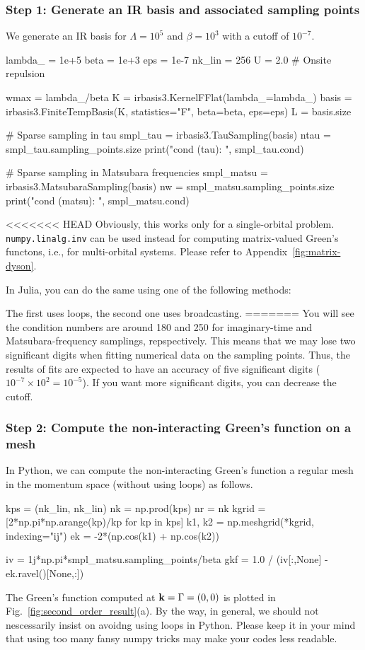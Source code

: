 \documentclass[submission, LectureNotes]{SciPost}
\newcommand{\bk}{\ensuremath{{\bf k}}}
\newcommand\ii{\mathrm{i}}%
\newcommand\iv{\ii\nu}%
\begin{document}
\subsubsection*{Step 1: Generate an IR basis and associated sampling points}
We generate an IR basis for $\Lambda=10^5$ and $\beta=10^3$ with a cutoff of $10^{-7}$.
\begin{python}
lambda_ = 1e+5
beta = 1e+3
eps = 1e-7
nk_lin = 256
U = 2.0 # Onsite repulsion

wmax = lambda_/beta
K = irbasis3.KernelFFlat(lambda_=lambda_)
basis = irbasis3.FiniteTempBasis(K, statistics="F", beta=beta, eps=eps)
L = basis.size

# Sparse sampling in tau
smpl_tau = irbasis3.TauSampling(basis)
ntau = smpl_tau.sampling_points.size
print("cond (tau): ", smpl_tau.cond)

# Sparse sampling in Matsubara frequencies
smpl_matsu = irbasis3.MatsubaraSampling(basis)
nw = smpl_matsu.sampling_points.size
print("cond (matsu): ", smpl_matsu.cond)
\end{python}
<<<<<<< HEAD
Obviously, this works only for a single-orbital problem.
\texttt{numpy.linalg.inv} can be used instead for computing matrix-valued Green's functons, i.e., for multi-orbital systems.
Please refer to Appendix~\ref{fig:matrix-dyson}.

In Julia, you can do the same using one of the following methods:

The first uses loops, the second one uses broadcasting.
=======
You will see the condition numbers are around 180 and 250 for imaginary-time and Matsubara-frequency samplings,
repspectively.
This means that we may lose two significant digits when fitting numerical data on the sampling points.
Thus, the results of fits are expected to have an accuracy of five significant digits ($10^{-7} \times 10^2 = 10^{-5}$).
If you want more significant digits, you can decrease the cutoff.

\subsubsection*{Step 2: Compute the non-interacting Green's function on a mesh}
In Python, we can compute the non-interacting Green's function a regular mesh in 
the momentum space (without using loops) as follows.
\begin{python}
kps = (nk_lin, nk_lin)
nk = np.prod(kps)
nr = nk
kgrid = [2*np.pi*np.arange(kp)/kp for kp in kps]
k1, k2 = np.meshgrid(*kgrid, indexing="ij")
ek = -2*(np.cos(k1) + np.cos(k2))

iv = 1j*np.pi*smpl_matsu.sampling_points/beta
gkf = 1.0 / (iv[:,None] - ek.ravel()[None,:])
\end{python}
The Green's function computed at $\bk=\Gamma=(0,0)$ is plotted in Fig.~\ref{fig:second_order_result}(a).
By the way, in general, we should not nescessarily insist on avoidng using loops in Python.
Please keep it in your mind that using too many fansy numpy tricks may make your codes less readable.
\end{document}
